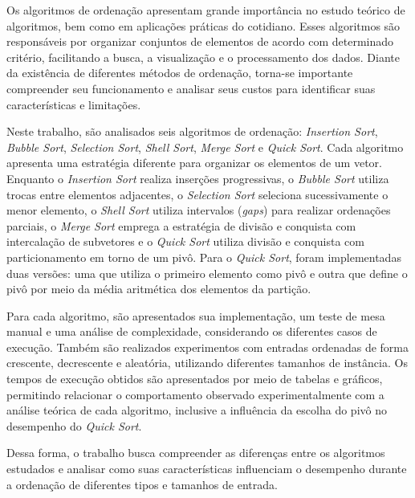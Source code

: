 \quad Os algoritmos de ordenação apresentam grande importância no estudo teórico de algoritmos, bem como em aplicações práticas do cotidiano. Esses algoritmos são responsáveis por organizar conjuntos de elementos de acordo com determinado critério, facilitando a busca, a visualização e o processamento dos dados. Diante da existência de diferentes métodos de ordenação, torna-se importante compreender seu funcionamento e analisar seus custos para identificar suas características e limitações.

\quad Neste trabalho, são analisados seis algoritmos de ordenação: \textit{Insertion Sort}, \textit{Bubble Sort}, \textit{Selection Sort}, \textit{Shell Sort}, \textit{Merge Sort} e \textit{Quick Sort}. Cada algoritmo apresenta uma estratégia diferente para organizar os elementos de um vetor. Enquanto o \textit{Insertion Sort} realiza inserções progressivas, o \textit{Bubble Sort} utiliza trocas entre elementos adjacentes, o \textit{Selection Sort} seleciona sucessivamente o menor elemento, o \textit{Shell Sort} utiliza intervalos (\textit{gaps}) para realizar ordenações parciais, o \textit{Merge Sort} emprega a estratégia de divisão e conquista com intercalação de subvetores e o \textit{Quick Sort} utiliza divisão e conquista com particionamento em torno de um pivô. Para o \textit{Quick Sort}, foram implementadas duas versões: uma que utiliza o primeiro elemento como pivô e outra que define o pivô por meio da média aritmética dos elementos da partição.

\quad Para cada algoritmo, são apresentados sua implementação, um teste de mesa manual e uma análise de complexidade, considerando os diferentes casos de execução. Também são realizados experimentos com entradas ordenadas de forma crescente, decrescente e aleatória, utilizando diferentes tamanhos de instância. Os tempos de execução obtidos são apresentados por meio de tabelas e gráficos, permitindo relacionar o comportamento observado experimentalmente com a análise teórica de cada algoritmo, inclusive a influência da escolha do pivô no desempenho do \textit{Quick Sort}.

\quad Dessa forma, o trabalho busca compreender as diferenças entre os algoritmos estudados e analisar como suas características influenciam o desempenho durante a ordenação de diferentes tipos e tamanhos de entrada.
